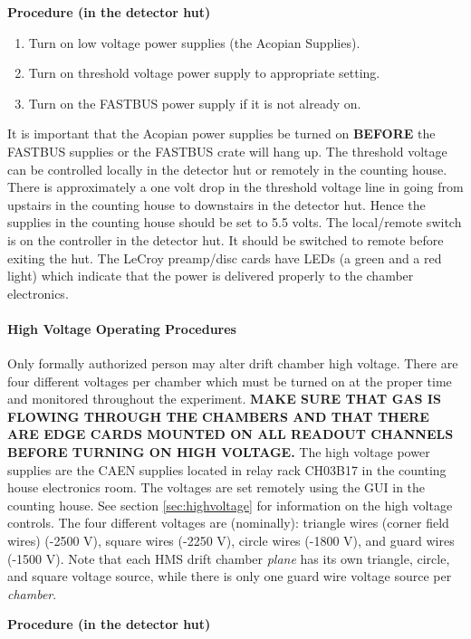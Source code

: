 \begin{center}
{\bf Procedure (in the detector hut)}
\end{center}

\begin{enumerate}
\item {Turn on low voltage power supplies (the Acopian Supplies).}
\item {Turn on threshold voltage power supply to appropriate setting.}
\item {Turn on the FASTBUS power supply if it is not already on.}
\end{enumerate}

It is important that the Acopian power supplies be turned on {\bf BEFORE} the
FASTBUS supplies or the FASTBUS crate will hang up.  The threshold voltage
can be controlled locally in the detector hut or remotely in the
counting house. There is approximately a one volt drop in the threshold
voltage line in going from upstairs in the counting house to
downstairs in the detector hut.  Hence the supplies in the counting
house should be set to 5.5 volts. The local/remote switch is on the
controller in the
detector hut.  It should be switched to remote before exiting the hut.  The
LeCroy preamp/disc cards have LEDs (a green and a red light) which indicate
that the power is delivered properly to the chamber electronics.

\paragraph{High Voltage Operating Procedures}

Only formally authorized person may alter drift chamber high voltage.
There are four different voltages per chamber which must be turned on at the
proper time and monitored throughout the experiment.  {\bf MAKE SURE THAT
GAS IS FLOWING THROUGH THE CHAMBERS AND THAT THERE ARE
EDGE
CARDS MOUNTED
ON ALL READOUT CHANNELS BEFORE TURNING ON HIGH VOLTAGE.}
The high voltage
power supplies are the CAEN supplies located in relay rack CH03B17 in
the counting house electronics room.  The
voltages are set remotely using the GUI in the counting
house. See section \ref{sec:highvoltage} for information on
the high voltage controls.
The four different voltages are (nominally): triangle
wires (corner field wires) (-2500 V),
square wires (-2250 V), circle wires (-1800 V), and guard wires (-1500 V).
Note that each HMS drift chamber {\em plane} has its own triangle, circle,
and square voltage source, while there is only one guard wire voltage
source per {\em chamber}.
\begin{center}
{\bf Procedure (in the detector hut)}
\end{center}

